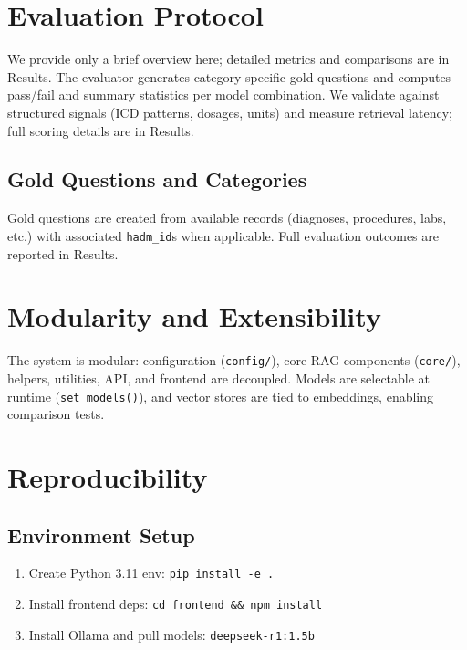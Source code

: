 \section{Evaluation Protocol}
We provide only a brief overview here; detailed metrics and comparisons are in Results. The evaluator generates category-specific gold questions and computes pass/fail and summary statistics per model combination. We validate against structured signals (ICD patterns, dosages, units) and measure retrieval latency; full scoring details are in Results.

\subsection{Gold Questions and Categories}
Gold questions are created from available records (diagnoses, procedures, labs, etc.) with associated \texttt{hadm\_id}s when applicable. Full evaluation outcomes are reported in Results.

\section{Modularity and Extensibility}
The system is modular: configuration (\texttt{config/}), core RAG components (\texttt{core/}), helpers, utilities, API, and frontend are decoupled. Models are selectable at runtime (\texttt{set\_models()}), and vector stores are tied to embeddings, enabling comparison tests.

\section{Reproducibility}

\subsection{Environment Setup}
\begin{enumerate}
  \item Create Python 3.11 env: \texttt{pip install -e .}
  \item Install frontend deps: \texttt{cd frontend \&\& npm install}
  \item Install Ollama and pull models: \texttt{deepseek-r1:1.5b}
\end{enumerate}

